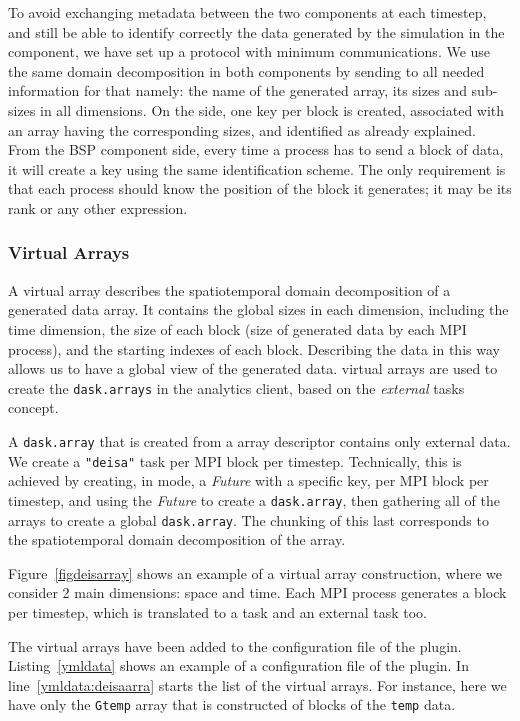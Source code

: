 To avoid exchanging metadata between the two components at each timestep, and still be able to identify correctly the data generated by the simulation in the \dask component, we have set up a protocol with minimum communications. We use the same domain decomposition in both components by sending to \dask all needed information for that namely: the name of the generated array, its sizes and sub-sizes in all dimensions. On the \dask side, one key per block is created, associated with an array having the corresponding sizes, and identified as already explained. From the BSP component side, every time a process has to send a block of data, it will create a key using the same identification scheme. The only requirement is that each process should know the position of the block it generates; it may be its rank or any other expression.  


\subsubsection{\deisa Virtual Arrays}\label{sec:deisavirtualarr}

A \deisa virtual array describes the spatiotemporal domain decomposition of a generated data array. It contains the global sizes in each dimension, including the time dimension, the size of each block (size of generated data by each MPI process), and the starting indexes of each block. Describing the data in this way allows us to have a global view of the generated data. \deisa virtual arrays are used to create the \texttt{dask.arrays} in the analytics client, based on the \textit{external} tasks concept.

A \texttt{dask.array} that is created from a \deisa array descriptor contains only external data. We create a \texttt{"deisa"} task per MPI block per timestep. Technically, this is achieved by creating, in \deisa mode, a \textit{Future} with a specific key, per MPI block per timestep, and using the \textit{Future} to create a \texttt{dask.array}, then gathering all of the arrays to create a global \texttt{dask.array}. The chunking of this last corresponds to the spatiotemporal domain decomposition of the \deisa array. 

Figure~\ref{figdeisarray} shows an example of a \deisa virtual array construction, where we consider 2 main dimensions: space and time. Each MPI process generates a block per timestep, which is translated to a \deisa task and an external task too. 

The \deisa virtual arrays have been added to the configuration file of the \deisa plugin. Listing~\ref{ymldata} shows an example of a configuration file of the \deisa plugin. In line~\ref{ymldata:deisaarra} starts the list of the \deisa virtual arrays. For instance, here we have only the \texttt{Gtemp} array that is constructed of blocks of the \texttt{temp} data.

